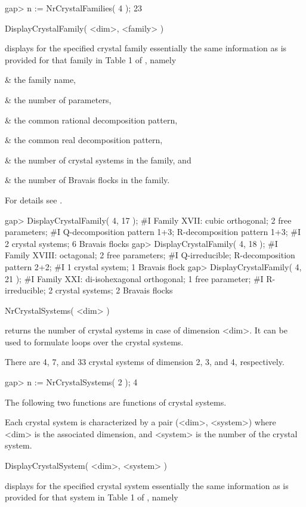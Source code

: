 \beginexample
gap> n := NrCrystalFamilies( 4 );
23
\endexample

\>DisplayCrystalFamily( <dim>, <family> )

displays for the specified crystal family essentially the same
information as is provided for that family in Table 1 of
\cite{BBNWZ78}, namely

\beginitems
& \itm the family name,

& \itm the number of parameters,

& \itm the common rational decomposition pattern,

& \itm the common real decomposition pattern,

& \itm the number of crystal systems in the family, and

& \itm the number of Bravais flocks in the family.
\enditems

For details see \cite{BBNWZ78}.

\beginexample
gap> DisplayCrystalFamily( 4, 17 );
#I Family XVII: cubic orthogonal; 2 free parameters;
#I  Q-decomposition pattern 1+3; R-decomposition pattern 1+3;
#I  2 crystal systems; 6 Bravais flocks
gap> DisplayCrystalFamily( 4, 18 );
#I Family XVIII: octagonal; 2 free parameters;
#I  Q-irreducible; R-decomposition pattern 2+2;
#I  1 crystal system; 1 Bravais flock
gap> DisplayCrystalFamily( 4, 21 );
#I Family XXI: di-isohexagonal orthogonal; 1 free parameter;
#I  R-irreducible; 2 crystal systems; 2 Bravais flocks
\endexample


\>NrCrystalSystems( <dim> )

returns the number of crystal systems in case of dimension <dim>. It
can be used to formulate loops over the crystal systems.

There are 4, 7, and 33 crystal systems of dimension 2, 3, and 4,
respectively.

\beginexample
gap> n := NrCrystalSystems( 2 );
4
\endexample

The following two functions are functions of crystal systems.

Each crystal system is characterized by a pair (<dim>, <system>) where
<dim>  is the associated dimension,  and  <system> is  the number of  the
crystal system.

\>DisplayCrystalSystem( <dim>, <system> )

displays for the specified crystal system essentially the same
information as is provided for that system in Table 1 of
\cite{BBNWZ78}, namely


